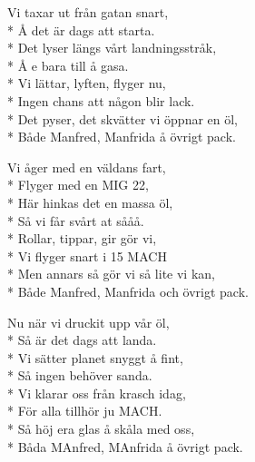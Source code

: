 \begin{SongText}[FLygturen]
\begin{SongVerse}
    \end{SongVerse}
    \begin{SongVerse}
        Vi taxar ut från gatan snart,\\*%
        Å det är dags att starta.\\*%
        Det lyser längs vårt landningsstråk,\\*%
        Å e bara till å gasa.\\*%
        Vi lättar, lyften, flyger nu,\\*%
        Ingen chans att någon blir lack.\\*%
        Det pyser, det skvätter vi öppnar en öl,\\*%
        Både Manfred, Manfrida å övrigt pack.
    \end{SongVerse}
    \begin{SongVerse}
        Vi åger med en väldans fart,\\*%
        Flyger med en MIG 22,\\*%
        Här hinkas det en massa öl,\\*%
        Så vi får svårt at sååå.\\*%
        Rollar, tippar, gir gör vi,\\*%
        Vi flyger snart i 15 MACH\\*%
        Men annars så gör vi så lite vi kan,\\*%
        Både Manfred, Manfrida och övrigt pack.
    \end{SongVerse}
    \begin{SongVerse}
        Nu när vi druckit upp vår öl,\\*%
        Så är det dags att landa.\\*%
        Vi sätter planet snyggt å fint,\\*%
        Så ingen behöver sanda.\\*%
        Vi klarar oss från krasch idag,\\*%
        För alla tillhör ju MACH.\\*%
        Så höj era glas å skåla med oss,\\*%
        Båda MAnfred, MAnfrida å övrigt pack.
    \end{SongVerse}
\end{SongText}

